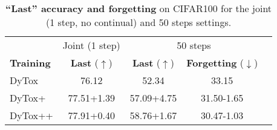 \begin{table}[t]
    \centering
    \begin{tabular}{@{}l|c|ccc}
        \hline
                          & Joint (1 step)                                  & \multicolumn{2}{c}{50 steps}                                                                             \\
        \textbf{Training} & \textbf{Last} ($\uparrow$)                      & \textbf{Last} ($\uparrow$)                      & \textbf{Forgetting} ($\downarrow$)\Tstrut\Bstrut       \\
        \hline
        DyTox             & 76.12                                           & 52.34                                           & 33.15 \Tstrut                                          \\
        DyTox+            & 77.51\scriptsize{\textcolor{OliveGreen}{+1.39}} & 57.09\scriptsize{\textcolor{OliveGreen}{+4.75}} & 31.50\scriptsize{\textcolor{OliveGreen}{-1.65}}\Bstrut \\
        DyTox++           & 77.91\scriptsize{\textcolor{OliveGreen}{+0.40}} & 58.76\scriptsize{\textcolor{OliveGreen}{+1.67}} & 30.47\scriptsize{\textcolor{OliveGreen}{-1.03}}        \\
        \hline
    \end{tabular}
    \caption{\textbf{``Last'' accuracy and forgetting} \cite{chaudhry2018riemannien_walk} on
        CIFAR100 for the joint (1 step, no continual) and 50 steps settings.}
    \label{tab:dytox_training_plus}
\end{table}
